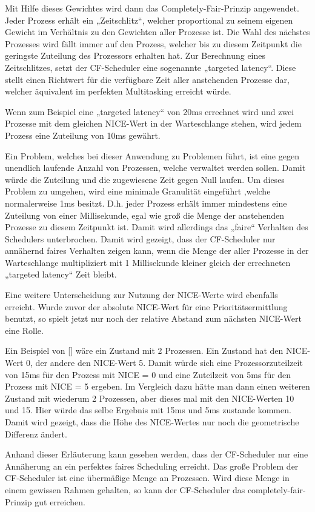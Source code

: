 Mit Hilfe dieses Gewichtes wird dann das Completely-Fair-Prinzip angewendet. Jeder Prozess erhält ein „Zeitschlitz“, welcher proportional zu seinem eigenen Gewicht im Verhältnis zu den Gewichten aller Prozesse ist. Die Wahl des nächstes Prozesses wird fällt immer auf den Prozess, welcher bis zu diesem Zeitpunkt die geringste Zuteilung des Prozessors erhalten hat.
Zur Berechnung eines Zeitschlitzes, setzt der CF-Scheduler eine sogenannte „targeted latency“. Diese stellt einen Richtwert für die verfügbare Zeit aller anstehenden Prozesse dar, welcher äquivalent im perfekten Multitasking erreicht würde.

Wenn zum Beispiel eine „targeted latency“ von 20ms errechnet wird und zwei Prozesse mit dem gleichen NICE-Wert in der Warteschlange stehen, wird jedem Prozess eine Zuteilung von 10ms gewährt.

Ein Problem, welches bei dieser Anwendung zu Problemen führt, ist eine gegen unendlich laufende Anzahl von Prozessen, welche verwaltet werden sollen. Damit würde die Zuteilung und die zugewiesene Zeit gegen Null laufen. Um dieses Problem zu umgehen, wird eine minimale Granulität eingeführt ,welche normalerweise 1ms besitzt. D.h. jeder Prozess erhält immer mindestens eine Zuteilung von einer Millisekunde, egal wie groß die Menge der anstehenden Prozesse zu diesem Zeitpunkt ist. Damit wird allerdings das „faire“ Verhalten des Schedulers unterbrochen. Damit wird gezeigt, dass der CF-Scheduler nur annähernd faires Verhalten zeigen kann, wenn die Menge der aller Prozesse in der Warteschlange multipliziert mit 1 Millisekunde kleiner gleich der errechneten „targeted latency“ Zeit bleibt.

Eine weitere Unterscheidung zur Nutzung der NICE-Werte wird ebenfalls erreicht. Wurde zuvor der absolute NICE-Wert für eine Prioritätsermittlung benutzt, so spielt jetzt nur noch der relative Abstand zum nächsten NICE-Wert eine Rolle.

Ein Beispiel von [\cite{rlove}] wäre ein Zustand mit 2 Prozessen. Ein Zustand hat den NICE-Wert 0, der andere den NICE-Wert 5. Damit würde sich eine Prozessorzuteilzeit von 15ms für den Prozess mit NICE = 0 und eine Zuteilzeit von 5ms für den Prozess mit NICE = 5 ergeben.
Im Vergleich dazu hätte man dann einen weiteren Zustand mit wiederum 2 Prozessen, aber dieses mal mit den NICE-Werten 10 und 15. Hier würde das selbe Ergebnis mit 15ms und 5ms zustande kommen. Damit wird gezeigt, dass die Höhe des NICE-Wertes nur noch die geometrische Differenz ändert.

Anhand dieser Erläuterung kann gesehen werden, dass der CF-Scheduler nur eine Annäherung an ein perfektes faires Scheduling erreicht. Das große Problem der CF-Scheduler ist eine übermäßige Menge an Prozessen. Wird diese Menge in einem gewissen Rahmen gehalten, so kann der CF-Scheduler das \glqq completely-fair\grqq -Prinzip gut erreichen. 
